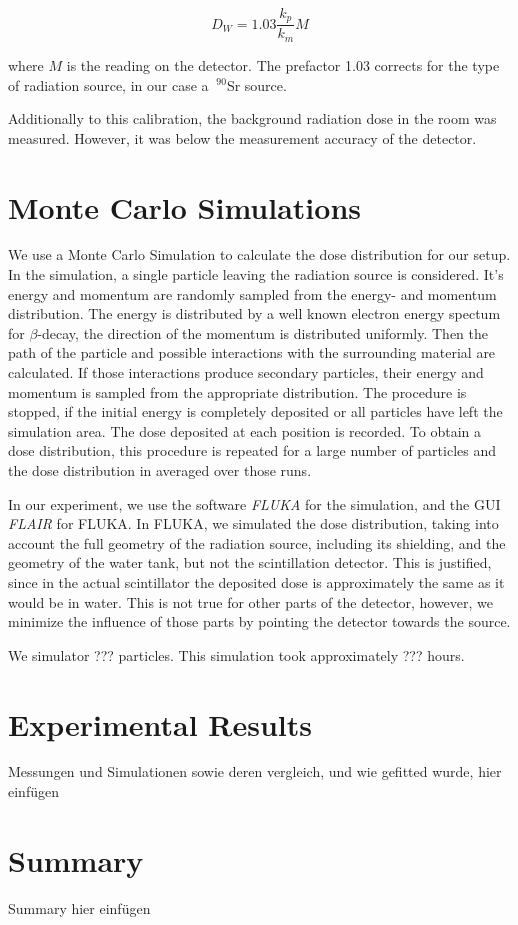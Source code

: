 \documentclass[a4paper,parskip]{scrartcl}
\begin{document}
$$D_W = 1.03\frac{k_p}{k_m}M$$

where $M$ is the reading on the detector. The prefactor 1.03 corrects for the type of radiation source, in our case a $~^{90}$Sr source.

Additionally to this calibration, the background radiation dose in the room was measured. However, it was below the measurement accuracy of the detector.

\section{Monte Carlo Simulations}
We use a Monte Carlo Simulation to calculate the dose distribution for our setup. In the simulation, a single particle leaving the radiation source is considered. It's energy and momentum are randomly sampled from the energy- and momentum distribution. The energy is distributed by a well known electron energy spectum for $\beta$-decay, the direction of the momentum is distributed uniformly. Then the path of the particle and possible interactions with the surrounding material are calculated. If those interactions produce secondary particles, their energy and momentum is sampled from the appropriate distribution. The procedure is stopped, if the initial energy is completely deposited or all particles have left the simulation area. The dose deposited at each position is recorded. To obtain a dose distribution, this procedure is repeated for a large number of particles and the dose distribution in averaged over those runs.

In our experiment, we use the software \textit{FLUKA} for the simulation, and the GUI \textit{FLAIR} for FLUKA. In FLUKA, we simulated the dose distribution, taking into account the full geometry of the radiation source, including its shielding, and the geometry of the water tank, but not the scintillation detector. This is justified, since in the actual scintillator the deposited dose is approximately the same as it would be in water. This is not true for other parts of the detector, however, we minimize the influence of those parts by pointing the detector towards the source.

We simulator {\color{red}???} particles. This simulation took approximately {\color{red}???} hours.


\section{Experimental Results}

{\color{red} Messungen und Simulationen sowie deren vergleich, und wie gefitted wurde, hier einfügen}

\section{Summary}

{\color{red} Summary hier einfügen}   

\newpage


\end{document}
